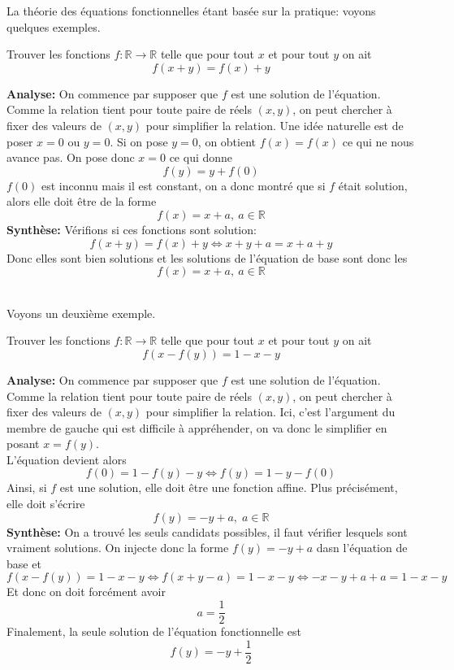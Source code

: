 La théorie  des équations fonctionnelles étant basée sur la pratique: voyons quelques exemples.
\begin{ex}
Trouver les fonctions $f:\mathbb{R}\to \mathbb{R}$ telle que pour tout $x$ et pour tout $y$ on ait
$$f(x+y)=f(x)+y $$
\end{ex}
\begin{preuve}
\textbf{Analyse:}
On commence par supposer que $f$ est une solution de l'équation.
\\

Comme la relation tient pour toute paire de réels $(x,y)$, on peut chercher à fixer des valeurs de $(x,y)$ pour simplifier la relation. Une idée naturelle est de poser $x=0$ ou $y=0$. Si on pose $y=0$, on obtient $f(x)=f(x)$ ce qui ne nous avance pas. On pose donc $x=0$ ce qui donne 
$$f(y)=y+f(0) $$
$f(0)$ est inconnu mais il est constant, on a donc montré que si $f$ était solution, alors elle doit être de la forme 
$$f(x)=x+a, \: a\in \mathbb{R} $$
\textbf{Synthèse:} Vérifions si ces fonctions sont solution:
$$f(x+y)=f(x)+y\iff x+y+a=x+a+y $$
Donc elles sont bien solutions et les solutions de l'équation de base sont donc les 
$$f(x)=x+a, \: a\in \mathbb{R} $$
\end{preuve}
\\
Voyons un deuxième exemple.
\begin{ex}
Trouver les fonctions $f:\mathbb{R}\to \mathbb{R}$ telle que pour tout $x$ et pour tout $y$ on ait
$$f(x-f(y))=1-x-y $$
\end{ex}

\begin{preuve}
\textbf{Analyse:}
On commence par supposer que $f$ est une solution de l'équation.
\\

Comme la relation tient pour toute paire de réels $(x,y)$, on peut chercher à fixer des valeurs de $(x,y)$ pour simplifier la relation. Ici, c'est l'argument du membre de gauche qui est difficile à appréhender, on va donc le simplifier en posant $x=f(y)$.
\\
L'équation devient alors
$$f(0)=1-f(y)-y\iff f(y)=1-y-f(0) $$
Ainsi, si $f$ est une solution, elle doit être une fonction affine. Plus précisément, elle doit s'écrire 
$$f(y)=-y+a, \; a\in \mathbb{R} $$
\textbf{Synthèse:}
On a trouvé les seuls candidats possibles, il faut vérifier lesquels sont vraiment solutions. On injecte donc la forme $f(y)=-y+a$ dasn l'équation de base et 
$$f(x-f(y))=1-x-y\iff f(x+y-a)=1-x-y\iff -x-y+a+a=1-x-y $$
Et donc on doit forcément avoir
$$a=\frac{1}{2} $$
Finalement, la seule solution de l'équation fonctionnelle est 
$$f(y)=-y+\frac{1}{2} $$
\end{preuve}


